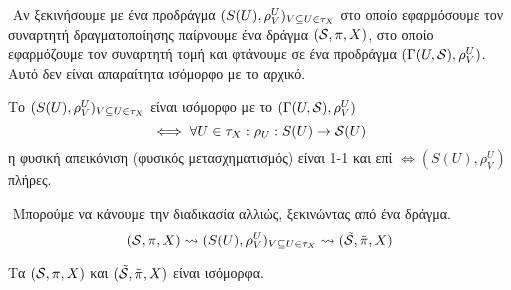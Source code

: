 
$ $\newline
Αν ξεκινήσουμε με ένα προδράγμα $(S(U),\rho^U_V)_{V\subseteq U\in \tau_X}$ στο οποίο εφαρμόσουμε τον συναρτητή δραγματοποίησης παίρνουμε ένα δράγμα $(\mathcal{S}, \pi, X)$, στο οποίο εφαρμόζουμε τον συναρτητή τομή και φτάνουμε σε ένα προδράγμα $(\Gamma(U,\mathcal{S}),\rho^U_V)$. Αυτό δεν είναι απαραίτητα ισόμορφο με το αρχικό.

\begin{prop}
Το $(S(U),\rho^U_V)_{V\subseteq U\in \tau_X}$ είναι ισόμορφο με το $(\Gamma(U,\mathcal{S}),\rho^U_V)$ 
$$\iff\forall U\in \tau_X: \rho_U : S(U) \rightarrow \mathcal{S}(U)$$ η φυσική απεικόνιση (φυσικός μετασχηματισμός) είναι 1-1 και επί $\iff (S(U),\rho^U_V)$ πλήρες.
\end{prop}

$ $\newline
Μπορούμε να κάνουμε την διαδικασία αλλιώς, ξεκινώντας από ένα δράγμα.
$$(\mathcal{S}, \pi, X) \mathrel{\leadsto} (S(U),\rho^U_V)_{V\subseteq U\in \tau_X} \mathrel{\leadsto} (\tilde{\mathcal{S}},\tilde{\pi},X)$$

\begin{theorem}
   Τα $(\mathcal{S}, \pi, X)$ και $(\tilde{\mathcal{S}},\tilde{\pi},X)$ είναι ισόμορφα.
\end{theorem}

